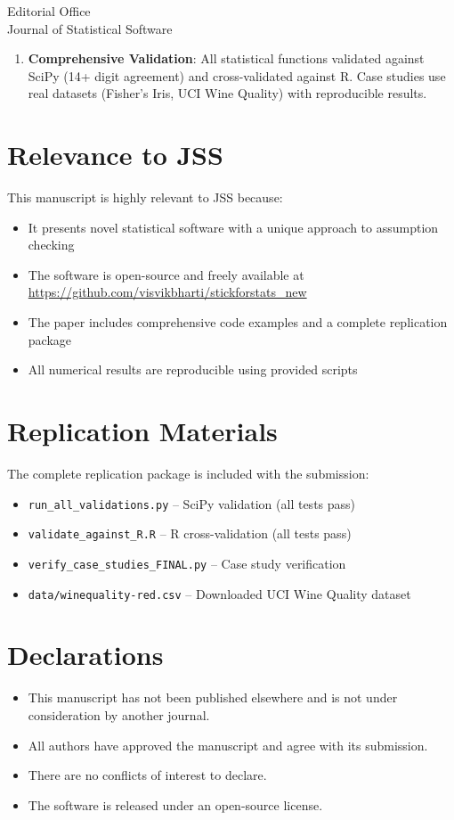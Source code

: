 \documentclass[11pt]{letter}
\begin{document}
\begin{letter}{
Editorial Office\\
Journal of Statistical Software\\
}
\begin{enumerate}
\item \textbf{Comprehensive Validation}: All statistical functions validated against SciPy (14+ digit agreement) and cross-validated against R. Case studies use real datasets (Fisher's Iris, UCI Wine Quality) with reproducible results.
\end{enumerate}

\section*{Relevance to JSS}

This manuscript is highly relevant to JSS because:
\begin{itemize}
\item It presents novel statistical software with a unique approach to assumption checking
\item The software is open-source and freely available at \url{https://github.com/visvikbharti/stickforstats_new}
\item The paper includes comprehensive code examples and a complete replication package
\item All numerical results are reproducible using provided scripts
\end{itemize}

\section*{Replication Materials}

The complete replication package is included with the submission:
\begin{itemize}
\item \texttt{run\_all\_validations.py} -- SciPy validation (all tests pass)
\item \texttt{validate\_against\_R.R} -- R cross-validation (all tests pass)
\item \texttt{verify\_case\_studies\_FINAL.py} -- Case study verification
\item \texttt{data/winequality-red.csv} -- Downloaded UCI Wine Quality dataset
\end{itemize}

\section*{Declarations}

\begin{itemize}
\item This manuscript has not been published elsewhere and is not under consideration by another journal.
\item All authors have approved the manuscript and agree with its submission.
\item There are no conflicts of interest to declare.
\item The software is released under an open-source license.
\end{itemize}


\end{letter}
\end{document}
